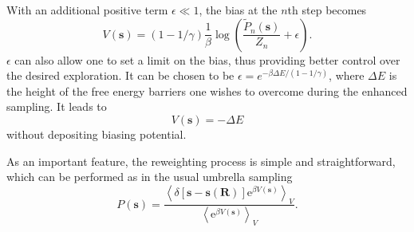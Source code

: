 With an additional positive term $\epsilon \ll 1$, the bias at the $n${th} step becomes
\begin{equation}
	V(\mathbf{s})=(1-1/\gamma)\frac{1}{\beta} \log{\left(\frac{\tilde{P}_n(\mathbf{s})}{Z_n}+\epsilon\right)}.
\end{equation}
$\epsilon$ can also allow one to set a limit on the bias, thus providing better control over the desired exploration. It can be chosen to be $\epsilon=e^{-\beta \Delta E/(1-1/\gamma)}$, where $\Delta E$ is the height of the free energy barriers one wishes to overcome during the enhanced sampling. It leads to
\begin{equation}
	V(\mathbf{s})= -\Delta E
\end{equation}
without depositing biasing potential.

As an important feature, the reweighting process is simple and straightforward, which can be performed as in the usual umbrella sampling
\begin{equation}
	P(\mathbf{s})=\frac{\left\langle\delta[\mathbf{s}-\mathbf{s}(\mathbf{R})] \mathrm{e}^{\beta V(\mathbf{s})}\right\rangle_V}{\left\langle\mathrm{e}^{\beta V(\mathbf{s})}\right\rangle_V}.
\end{equation}
